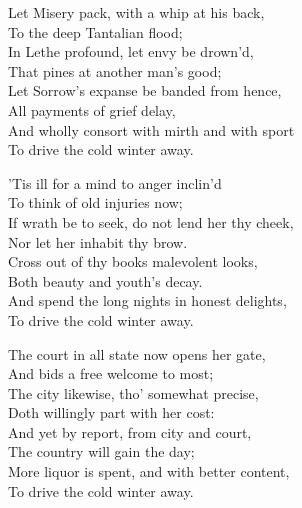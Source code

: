 \settowidth{\versewidth}{If wrath be to seek, do not lend her thy cheek,zz}
\begin{dcverse}\footnotesizerr
\begin{altverse}
Let Misery pack, with a whip at his back,\\
To the deep Tantalian flood;\\
In Lethe profound, let envy be drown’d,\\
That pines at another man’s good;\\
Let Sorrow’s expanse be banded from hence,\\
All payments of grief delay,\\
And wholly consort with mirth and with sport\\
To drive the cold winter away.
\end{altverse}

\begin{altverse}
{’}Tis ill for a mind to anger inclin{’d}\\
To think of old injuries now;\\
If wrath be to seek, do not lend her thy cheek,\\
Nor let her inhabit thy brow.\\
Cross out of thy books malevolent looks,\\
Both beauty and youth’s decay.\\
And spend the long nights in honest delights,\\
To drive the cold winter away.
\end{altverse}

\begin{altverse}
The court in all state now opens her gate,\\
And bids a free welcome to most;\\
The city likewise, tho’ somewhat precise,\\
Doth willingly part with her cost:\\
And yet by report, from city and court,\\
The country will gain the day;\\
More liquor is spent, and with better content,\\
To drive the cold winter away.
\end{altverse}


\end{dcverse}
